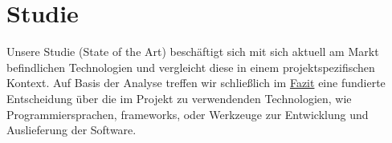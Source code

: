 \chapter{Studie}

Unsere Studie (State of the Art) beschäftigt sich mit sich aktuell am Markt befindlichen Technologien und vergleicht diese in einem projektspezifischen Kontext. Auf Basis der Analyse treffen wir schließlich im \hyperref[sec:fazit]{Fazit} eine fundierte Entscheidung über die im Projekt zu verwendenden Technologien, wie Programmiersprachen, \gls{framework}s, oder Werkzeuge zur Entwicklung und Auslieferung der Software.